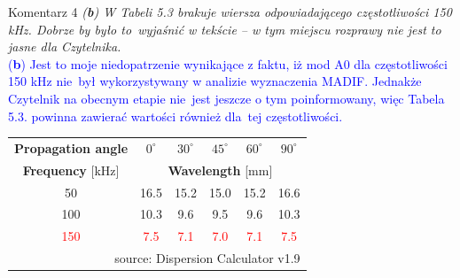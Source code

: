 \documentclass[10pt,aspectratio=169]{beamer} %
\begin{document}
\begin{frame}[label=frame7]{Komentarz 4}\justifying
\textit{(\textbf{b}) W Tabeli 5.3 brakuje wiersza odpowiadającego częstotliwości 150 kHz. Dobrze by było to~wyjaśnić w tekście – w tym miejscu rozprawy nie jest to jasne dla Czytelnika.}\\
\textcolor{blue}{(\textbf{b}) Jest to moje niedopatrzenie wynikające z faktu, iż mod A0 dla częstotliwości 150 kHz nie~był wykorzystywany w analizie wyznaczenia MADIF. Jednakże Czytelnik na obecnym etapie nie~jest jeszcze o tym poinformowany, więc Tabela 5.3. powinna zawierać wartości również dla~tej częstotliwości.}
\begin{table}[H]
	\small
	\tabcolsep=0.5cm
	\centering
	\begin{tabular}{cccccc}
		\toprule
		\textbf{Propagation angle} & \(0^{\circ}\) & \(30^{\circ}\) & \(45^{\circ}\) & \(60^{\circ}\) & \(90^{\circ}\)\\
		\textbf{Frequency} [kHz] & \multicolumn{5}{c}{\textbf{Wavelength} [mm]}\\
		\midrule
		50 & 16.5 & 15.2 & 15.0 & 15.2 & 16.6\\
		100 & 10.3 & 9.6 & 9.5 & 9.6 & 10.3\\
		\textcolor{red}{150} & \textcolor{red}{7.5} & \textcolor{red}{7.1} & \textcolor{red}{7.0} & \textcolor{red}{7.1} & \textcolor{red}{7.5}\\
		\bottomrule
		\multicolumn{6}{r}{{\scriptsize{source: Dispersion Calculator v1.9}}}
	\end{tabular}
\end{table}
\end{frame}
\end{document}
